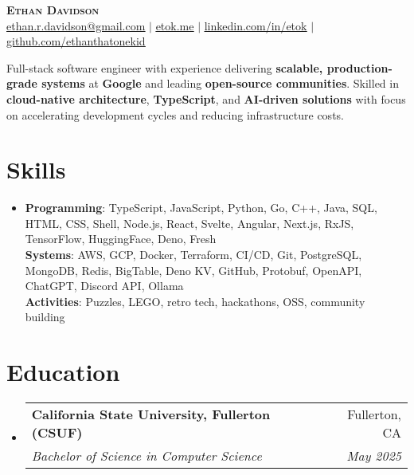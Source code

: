 \documentclass[letterpaper,11pt]{article}
\makeatletter
\newcommand{\resumeItem}[1]{
  \item\small{
    {#1 \vspace{-2pt}}
  }
}
\newcommand{\resumeSubheading}[4]{
  \vspace{-2pt}\item
    \begin{tabular*}{0.97\textwidth}[t]{l@{\extracolsep{\fill}}r}
      \textbf{#1} & #2 \\
      \textit{\small#3} & \textit{\small #4} \\
    \end{tabular*}\vspace{-7pt}
}
\newcommand{\resumeSubHeadingListStart}{\begin{itemize}[leftmargin=0.15in, label={}]}
\newcommand{\resumeSubHeadingListEnd}{\end{itemize}}
\makeatother
\begin{document}
\begin{center}
  \textbf{\Huge \scshape Ethan Davidson} \\ \vspace{1pt}
  \small \href{mailto:ethan.r.davidson@gmail.com}{\underline{ethan.r.davidson@gmail.com}} $|$ 
  \href{https://etok.me}{\underline{etok.me}} $|$
  \href{https://linkedin.com/in/etok}{\underline{linkedin.com/in/etok}} $|$
  \href{https://github.com/ethanthatonekid}{\underline{github.com/ethanthatonekid}}
\end{center}

\resumeItem{Full-stack software engineer with experience delivering \textbf{scalable, production-grade systems} at \textbf{Google} and leading \textbf{open-source communities}. Skilled in \textbf{cloud-native architecture}, \textbf{TypeScript}, and \textbf{AI-driven solutions} with focus on accelerating development cycles and reducing infrastructure costs.}

\section{Skills}
\begin{itemize}[leftmargin=0.15in, label={}]
    \resumeItem{
      \textbf{Programming}{: TypeScript, JavaScript, Python, Go, C++, Java, SQL, HTML, CSS, Shell, Node.js, React, Svelte, Angular, Next.js, RxJS, TensorFlow, HuggingFace, Deno, Fresh} \\
      \textbf{Systems}{: AWS, GCP, Docker, Terraform, CI/CD, Git, PostgreSQL, MongoDB, Redis, BigTable, Deno KV, GitHub, Protobuf, OpenAPI, ChatGPT, Discord API, Ollama} \\
      \textbf{Activities}{: Puzzles, LEGO, retro tech, hackathons, OSS, community building}
    }
 \end{itemize}

\section{Education}
\resumeSubHeadingListStart
  \resumeSubheading
    {California State University, Fullerton (CSUF)}{Fullerton, CA}
    {Bachelor of Science in Computer Science}{May 2025}
\resumeSubHeadingListEnd

\end{document}
